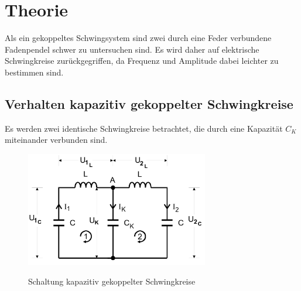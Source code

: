 \section{Theorie}
\label{sec:Theorie}

Als ein gekoppeltes Schwingsystem sind zwei durch eine Feder verbundene Fadenpendel schwer zu untersuchen sind.
Es wird daher auf elektrische Schwingkreise zurückgegriffen, da Frequenz und Amplitude dabei leichter zu bestimmen sind.

\subsection {Verhalten kapazitiv gekoppelter Schwingkreise}

Es werden zwei identische Schwingkreise betrachtet, die durch eine Kapazität $C_{K}$ miteinander verbunden sind.

\begin{figure} 
    \centering
    \includegraphics[width=8cm] {pictures/prinzipschaltbild.png} \cite{v355} 
    \caption{Schaltung kapazitiv gekoppelter Schwingkreise}
    \label{fig:prinzipschaltbild}
\end{figure} 

